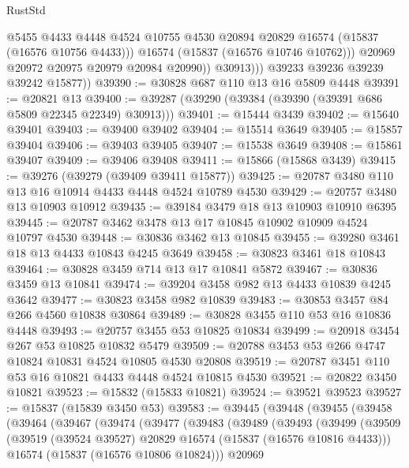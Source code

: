 \begin{lexlean}{RustStd}
\begin{coremodule}
                      @5455
                      @4433
                      @4448
                      @4524
                      @10755
                      @4530
                      @20894
                      @20829
                      @16574
                      (@15837 (@16576 @10756 @4433)))
                    @16574
                    (@15837 (@16576 @10746 @10762)))
                  @20969
                  @20972
                  @20975
                  @20979
                  @20984
                  @20990))
              @30913)))
        @39233
        @39236
        @39239
        @39242
        @15877))
@39390 := @30828 @687 @110 @13 @16 @5809 @4448
@39391 := @20821 @13
@39400 := @39287 (@39290 (@39384 (@39390 (@39391 @686 @5809 @22345 @22349) @30913)))
@39401 := @15444 @3439
@39402 := @15640 @39401
@39403 := @39400 @39402
@39404 := @15514 @3649
@39405 := @15857 @39404
@39406 := @39403 @39405
@39407 := @15538 @3649
@39408 := @15861 @39407
@39409 := @39406 @39408
@39411 := @15866 (@15868 @3439)
@39415 := @39276 (@39279 (@39409 @39411 @15877))
@39425 := @20787 @3480 @110 @13 @16 @10914 @4433 @4448 @4524 @10789 @4530
@39429 := @20757 @3480 @13 @10903 @10912
@39435 := @39184 @3479 @18 @13 @10903 @10910 @6395
@39445 := @20787 @3462 @3478 @13 @17 @10845 @10902 @10909 @4524 @10797 @4530
@39448 := @30836 @3462 @13 @10845
@39455 := @39280 @3461 @18 @13 @4433 @10843 @4245 @3649
@39458 := @30823 @3461 @18 @10843
@39464 := @30828 @3459 @714 @13 @17 @10841 @5872
@39467 := @30836 @3459 @13 @10841
@39474 := @39204 @3458 @982 @13 @4433 @10839 @4245 @3642
@39477 := @30823 @3458 @982 @10839
@39483 := @30853 @3457 @84 @266 @4560 @10838 @30864
@39489 := @30828 @3455 @110 @53 @16 @10836 @4448
@39493 := @20757 @3455 @53 @10825 @10834
@39499 := @20918 @3454 @267 @53 @10825 @10832 @5479
@39509 := @20788 @3453 @53 @266 @4747 @10824 @10831 @4524 @10805 @4530 @20808
@39519 := @20787 @3451 @110 @53 @16 @10821 @4433 @4448 @4524 @10815 @4530
@39521 := @20822 @3450 @10821
@39523 := @15832 (@15833 @10821)
@39524 := @39521 @39523
@39527 := @15837 (@15839 @3450 @53)
@39583 := @39445
    (@39448
      (@39455
        (@39458
          (@39464
            (@39467
              (@39474
                (@39477
                  (@39483
                    (@39489
                      (@39493
                        (@39499
                          (@39509
                            (@39519 (@39524 @39527) @20829 @16574 (@15837 (@16576 @10816 @4433)))
                            @16574
                            (@15837 (@16576 @10806 @10824)))
                          @20969

\end{coremodule}
\end{lexlean}
